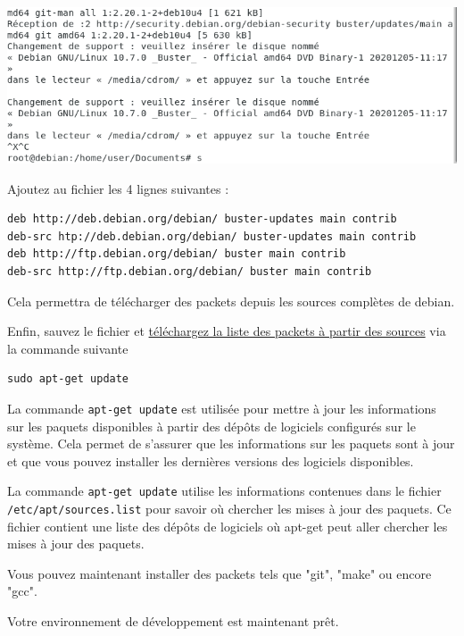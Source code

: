\documentclass[12pt,a4paper]{article}
\newcommand{\code}[1]{\colorbox{light-gray}{\texttt{#1}}}
\begin{document}
\begin{flushleft}
        \begin{center}
            \includegraphics[scale=0.6]{cdrom}
        \end{center}
       \item Ajoutez au fichier les 4 lignes suivantes : 
       \begin{lstlisting}
deb http://deb.debian.org/debian/ buster-updates main contrib
deb-src htp://deb.debian.org/debian/ buster-updates main contrib
deb http://ftp.debian.org/debian/ buster main contrib
deb-src http://ftp.debian.org/debian/ buster main contrib
       \end{lstlisting}
    \item Cela permettra de télécharger des packets depuis les sources complètes de debian. 
    \item Enfin, sauvez le fichier et \underline{téléchargez la liste des packets à partir des sources} via la commande suivante
    \begin{lstlisting}
sudo apt-get update
    \end{lstlisting}
    \item La commande \code{apt-get update} est utilisée pour mettre à jour les informations sur les paquets disponibles à partir des dépôts de logiciels configurés sur le système. Cela permet de s'assurer que les informations sur les paquets sont à jour et que vous pouvez installer les dernières versions des logiciels disponibles.
    \item La commande \code{apt-get update} utilise les informations contenues dans le fichier \code{/etc/apt/sources.list} pour savoir où chercher les mises à jour des paquets. Ce fichier contient une liste des dépôts de logiciels où apt-get peut aller chercher les mises à jour des paquets. 
    \item Vous pouvez maintenant installer des packets tels que "git", "make" ou encore "gcc".
    \item Votre environnement de développement est maintenant prêt.
   \end{flushleft}
\end{document}
